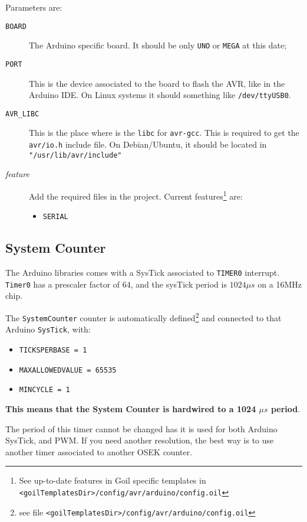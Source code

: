Parameters are:
\begin{description}
\item[\texttt{BOARD}] The Arduino specific board. It should be only \texttt{UNO} or \texttt{MEGA} at this date;
\item[\texttt{PORT}] This is the device associated to the board to flash the AVR, like in the Arduino IDE. On Linux systems it should something like \texttt{/dev/ttyUSB0}.
\item[\texttt{AVR\_LIBC}] This is the place where is the \texttt{libc} for \texttt{avr-gcc}. This is required to get the \texttt{avr/io.h} include file. On Debian/Ubuntu, it should be located in \texttt{"/usr/lib/avr/include"}
\item[\textit{feature}] Add the required files in the project. Current features\footnote{See up-to-date features in Goil specific templates in \texttt{<goilTemplatesDir>/config/avr/arduino/config.oil}} are:
\begin{itemize}
\item \texttt{SERIAL}
\end{itemize}
\end{description}

\subsection{System Counter}
The Arduino libraries comes with a SysTick associated to \texttt{TIMER0} interrupt. \texttt{Timer0} has a prescaler factor of 64, and the sysTick period is \textbf{$1024\mu s$} on a 16MHz chip.

The \texttt{SystemCounter} counter is automatically defined\footnote{see file \texttt{<goilTemplatesDir>/config/avr/arduino/config.oil}} and connected to that Arduino \texttt{SysTick}, with:
\begin{itemize}
\item \texttt{TICKSPERBASE = 1}
\item \texttt{MAXALLOWEDVALUE = 65535}
\item \texttt{MINCYCLE = 1}
\end{itemize}

\textbf{This means that the System Counter is hardwired to a 1024 $\mu s$ period}.

The period of this timer cannot be changed has it is used for both Arduino SysTick, and PWM. If you need another resolution, the best way is to use another timer associated to another OSEK counter.
